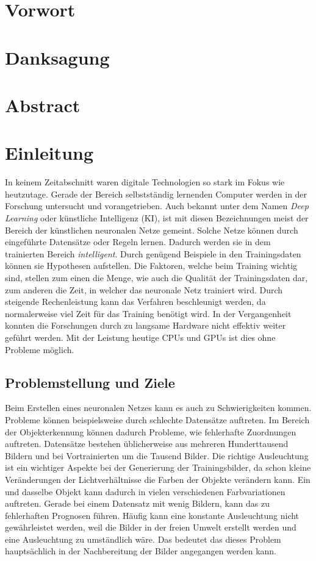 \documentclass[a4paper,12pt,oneside]{article}
\begin{document}
  \newpage
  \section*{Vorwort}
  \section*{Danksagung}
  \section*{Abstract}
  \newpage
  \listoffigures
  \newpage
  \listoftables
  \newpage
  \tableofcontents
  \newpage
  \section{Einleitung}\label{s.einleitung} 
In keinem Zeitabschnitt waren digitale Technologien so stark im Fokus wie heutzutage. Gerade der Bereich selbstständig lernenden Computer werden in der Forschung untersucht und vorangetrieben. Auch bekannt unter dem Namen \textit{Deep Learning} oder künstliche Intelligenz (KI), ist mit diesen Bezeichnungen meist der Bereich der künstlichen neuronalen Netze gemeint. Solche Netze können durch eingeführte Datensätze oder Regeln lernen. Dadurch werden sie in dem trainierten Bereich \textit{intelligent}. Durch genügend Beispiele in den Trainingsdaten können sie Hypothesen aufstellen. Die Faktoren, welche beim Training wichtig sind, stellen zum einen die Menge, wie auch die Qualität der Trainingsdaten dar, zum anderen die Zeit, in welcher das neuronale Netz trainiert wird. Durch steigende Rechenleistung kann das Verfahren beschleunigt werden, da normalerweise viel Zeit für das Training benötigt wird. In der Vergangenheit konnten die Forschungen durch zu langsame Hardware nicht effektiv weiter geführt werden. Mit der Leistung heutige CPUs und GPUs ist dies ohne Probleme möglich.\\ 
  \subsection{Problemstellung und Ziele}\label{s.probuziel}
Beim Erstellen eines neuronalen Netzes kann es auch zu Schwierigkeiten kommen. Probleme können beispielsweise durch schlechte Datensätze auftreten. Im Bereich der Objekterkennung können dadurch Probleme, wie fehlerhafte Zuordnungen auftreten. Datensätze bestehen üblicherweise aus mehreren Hunderttausend Bildern und bei Vortrainierten um die Tausend Bilder. Die richtige Ausleuchtung ist ein wichtiger Aspekte bei der Generierung der Trainingsbilder, da schon kleine Veränderungen der Lichtverhältnisse die Farben der Objekte verändern kann. Ein und dasselbe Objekt kann dadurch in vielen verschiedenen Farbvariationen auftreten. Gerade bei einem Datensatz mit wenig Bildern, kann das zu fehlerhaften Prognosen führen. Häufig kann eine konstante Ausleuchtung nicht gewährleistet werden, weil die Bilder in der freien Umwelt erstellt werden und eine Ausleuchtung zu umständlich wäre. Das bedeutet das dieses Problem hauptsächlich in der Nachbereitung der Bilder angegangen werden kann.\\
\end{document}
